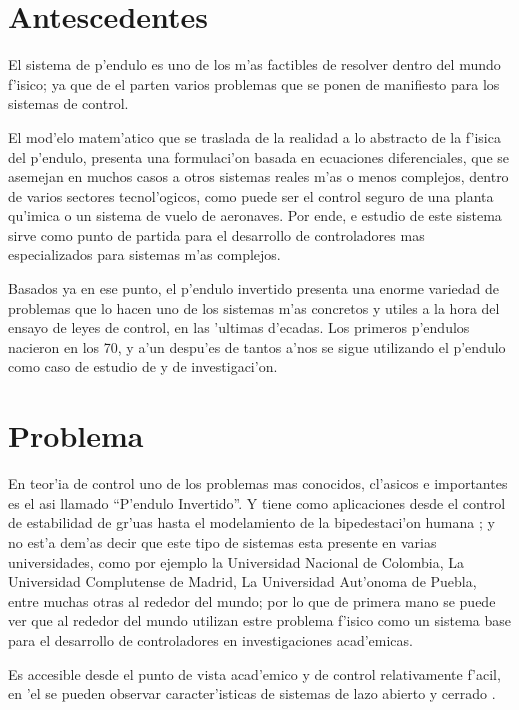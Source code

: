 \section{Antescedentes}

El sistema de p'endulo es uno de los m'as factibles de resolver dentro del mundo f'isico; ya que de el parten varios problemas que se ponen de manifiesto para los sistemas de control\citep{BoteOrtega}.

El mod'elo matem'atico que se traslada de la realidad a lo abstracto de la f'isica del p'endulo, presenta una formulaci'on basada en ecuaciones diferenciales, que se asemejan en muchos casos a otros sistemas reales m'as o menos complejos, dentro de varios sectores tecnol'ogicos, como puede ser el control seguro de una planta qu'imica o un sistema de vuelo de aeronaves. Por ende, e estudio de este sistema sirve como punto de partida para el desarrollo de controladores mas especializados para sistemas m'as complejos\citep{BoteOrtega}.


Basados ya en ese punto, el p'endulo invertido presenta una enorme variedad de problemas que lo hacen uno de los sistemas m'as concretos y utiles a la hora del ensayo de leyes de control, en las 'ultimas d'ecadas. Los primeros p'endulos nacieron en los 70, y a'un despu'es de tantos a'nos se sigue utilizando el p'endulo como caso de estudio de y de investigaci'on\citep{BoteOrtega}. 

\section{Problema}


En teor'ia de control uno de los problemas mas conocidos, cl'asicos e importantes es el asi llamado ``P'endulo Invertido''. Y tiene como aplicaciones desde el control de estabilidad de gr'uas hasta el modelamiento de la bipedestaci'on humana \citep{Legaspi12}; y no est'a dem'as decir que este tipo de sistemas esta presente en varias universidades, como por ejemplo la Universidad Nacional de Colombia, La Universidad Complutense de Madrid, La Universidad Aut'onoma de Puebla, entre muchas otras al rededor del mundo; por lo que de primera mano se puede ver que al rededor del mundo utilizan estre problema f'isico como un sistema base para el desarrollo de controladores en investigaciones acad'emicas.

Es accesible desde el punto de vista acad'emico y de control relativamente f'acil, en 'el se pueden observar caracter'isticas de sistemas de lazo abierto y cerrado \citep{Legaspi12}.

